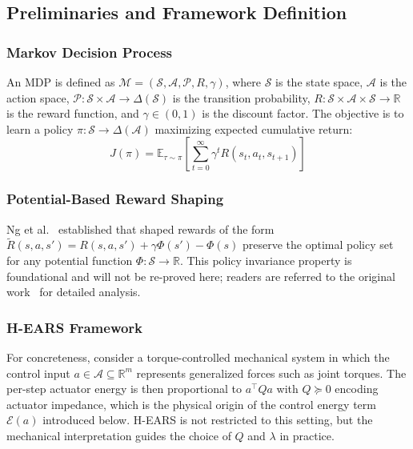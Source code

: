 \documentclass[journal]{IEEEtran}
\begin{document}
	\subsection{Preliminaries and Framework Definition}
	
	\subsubsection{Markov Decision Process}
	An MDP is defined as $\mathcal{M}=(\mathcal{S},\mathcal{A},\mathcal{P},R,\gamma)$, where $\mathcal{S}$ is the state space, $\mathcal{A}$ is the action space, $\mathcal{P}:\mathcal{S}\times\mathcal{A}\to\Delta(\mathcal{S})$ is the transition probability, $R:\mathcal{S}\times\mathcal{A}\times\mathcal{S}\to\mathbb{R}$ is the reward function, and $\gamma\in(0,1)$ is the discount factor. The objective is to learn a policy $\pi:\mathcal{S}\to\Delta(\mathcal{A})$ maximizing expected cumulative return:
	\begin{equation}
		J(\pi) = \mathbb{E}_{\tau\sim\pi}\left[\sum_{t=0}^{\infty}\gamma^t R(s_t,a_t,s_{t+1})\right]
	\end{equation}
	
	\subsubsection{Potential-Based Reward Shaping}
	Ng et al.~\cite{ng1999policy} established that shaped rewards of the form $\tilde{R}(s,a,s') = R(s,a,s') + \gamma\Phi(s')-\Phi(s)$ preserve the optimal policy set for any potential function $\Phi:\mathcal{S}\to\mathbb{R}$. This policy invariance property is foundational and will not be re-proved here; readers are referred to the original work~\cite{ng1999policy} for detailed analysis.
	
	\subsubsection{H-EARS Framework}
	For concreteness, consider a torque-controlled mechanical system in which the control input $a\in\mathcal{A}\subseteq\mathbb{R}^m$ represents generalized forces such as joint torques. The per-step actuator energy is then proportional to $a^\top Q a$ with $Q\succeq 0$ encoding actuator impedance, which is the physical origin of the control energy term $\mathcal{E}(a)$ introduced below. H-EARS is not restricted to this setting, but the mechanical interpretation guides the choice of $Q$ and $\lambda$ in practice.
	
\end{document}
